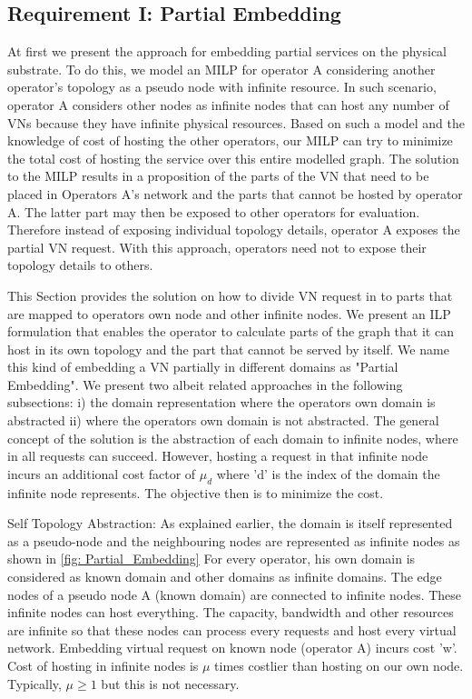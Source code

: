 \documentclass[article,dr=phil,type=msc ,colorback,accentcolor=tud4b]{tudthesis}
\begin{document}
\newpage
\subsection{Requirement I: Partial Embedding}
At first we present the approach for embedding partial services on the physical substrate. To do this, we model an MILP for operator A considering
another operator's topology as a pseudo node with infinite resource. In such scenario, operator A considers other nodes as infinite nodes that can host any number of VNs because they have infinite physical resources. Based on such a model and the knowledge of cost of hosting the other operators, our MILP can try to minimize the total cost of hosting the service over this entire modelled graph. The solution to the MILP results in a proposition of the parts of the VN that need to be placed in Operators A’s network and the parts that cannot be hosted by operator A. The latter part may then be exposed to other operators for evaluation. Therefore instead of exposing individual topology details, operator A exposes the partial VN request. With this approach, operators need not to expose their topology details to others. \newline

This Section provides the solution on how to divide VN request in to parts that are mapped to operators own node and other infinite nodes. We present an ILP formulation that enables the operator to calculate parts of the graph that it can host in its own topology and the part that cannot be served by itself. We name this kind of embedding a VN partially in different domains as "Partial Embedding". We present two albeit related approaches in the following subsections: i) the domain representation where the operators own domain is abstracted ii) where the operators own domain is not abstracted. The
general concept of the solution is the abstraction of each domain to infinite nodes, where in all requests can succeed. However, hosting a request in that infinite node incurs an additional cost factor of $\mu_{d}$ where 'd' is the index of the domain the infinite node represents. The objective then is to minimize the cost. \newline

Self Topology Abstraction: As explained earlier, the domain is itself represented as a pseudo-node and the neighbouring nodes are represented as infinite nodes as shown in \ref{fig: Partial_Embedding} For every operator, his own domain is considered as known domain and other domains as infinite domains. The edge nodes of a pseudo node A (known domain) are connected to infinite nodes. These infinite nodes can host everything. The capacity, bandwidth and other resources are infinite so that these nodes can process every requests and host every virtual network. Embedding virtual request on known node (operator A) incurs cost 'w'. Cost of hosting in infinite nodes is $\mu$ times costlier than hosting on our own node. Typically,  $\mu \geq 1$ but this is not necessary. \newline
\end{document}
